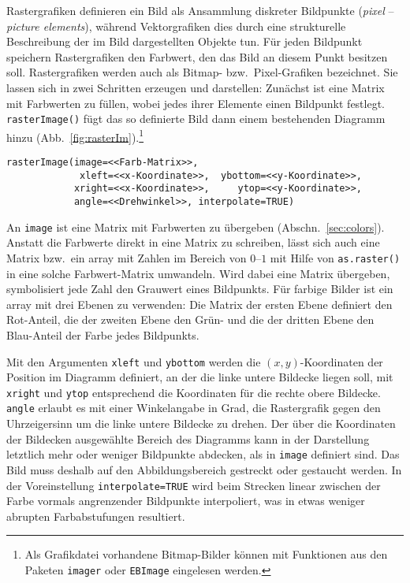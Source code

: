 Rastergrafiken definieren ein Bild als Ansammlung diskreter Bildpunkte (\emph{pixel} -- \emph{picture elements}), während Vektorgrafiken dies durch eine strukturelle Beschreibung der im Bild dargestellten Objekte tun. Für jeden Bildpunkt speichern Rastergrafiken den Farbwert, den das Bild an diesem Punkt besitzen soll. Rastergrafiken werden auch als Bitmap- bzw.\ Pixel-Grafiken bezeichnet. Sie lassen sich in zwei Schritten erzeugen und darstellen: Zunächst ist eine Matrix mit Farbwerten zu füllen, wobei jedes ihrer Elemente einen Bildpunkt festlegt. \lstinline!rasterImage()! fügt das so definierte Bild dann einem bestehenden Diagramm hinzu (Abb.\ \ref{fig:rasterIm}).\footnote{Als Grafikdatei vorhandene Bitmap-Bilder können mit Funktionen aus den Paketen \lstinline!imager! \cite{Barthelme2019} oder \lstinline!EBImage! \cite{Pau2010} eingelesen werden.}
\begin{lstlisting}
rasterImage(image=<<Farb-Matrix>>,
             xleft=<<x-Koordinate>>,  ybottom=<<y-Koordinate>>,
            xright=<<x-Koordinate>>,     ytop=<<y-Koordinate>>,
            angle=<<Drehwinkel>>, interpolate=TRUE)
\end{lstlisting}

An \lstinline!image! ist eine Matrix mit Farbwerten zu übergeben (Abschn.\ \ref{sec:colors}). Anstatt die Farbwerte direkt in eine Matrix zu schreiben, lässt sich auch eine Matrix bzw.\ ein array mit Zahlen im Bereich von $0$--$1$ mit Hilfe von \lstinline!as.raster()! in eine solche Farbwert-Matrix umwandeln. Wird dabei eine Matrix übergeben, symbolisiert jede Zahl den Grauwert eines Bildpunkts. Für farbige Bilder ist ein array mit drei Ebenen zu verwenden: Die Matrix der ersten Ebene definiert den Rot-Anteil, die der zweiten Ebene den Grün- und die der dritten Ebene den Blau-Anteil der Farbe jedes Bildpunkts.

Mit den Argumenten \lstinline!xleft! und \lstinline!ybottom! werden die $(x, y)$-Koordinaten der Position im Diagramm definiert, an der die linke untere Bildecke liegen soll, mit \lstinline!xright! und \lstinline!ytop! entsprechend die Koordinaten für die rechte obere Bildecke. \lstinline!angle! erlaubt es mit einer Winkelangabe in Grad, die Rastergrafik gegen den Uhrzeigersinn um die linke untere Bildecke zu drehen. Der über die Koordinaten der Bildecken ausgewählte Bereich des Diagramms kann in der Darstellung letztlich mehr oder weniger Bildpunkte abdecken, als in \lstinline!image! definiert sind. Das Bild muss deshalb auf den Abbildungsbereich gestreckt oder gestaucht werden. In der Voreinstellung \lstinline!interpolate=TRUE! wird beim Strecken linear zwischen der Farbe vormals angrenzender Bildpunkte interpoliert, was in etwas weniger abrupten Farbabstufungen resultiert.

